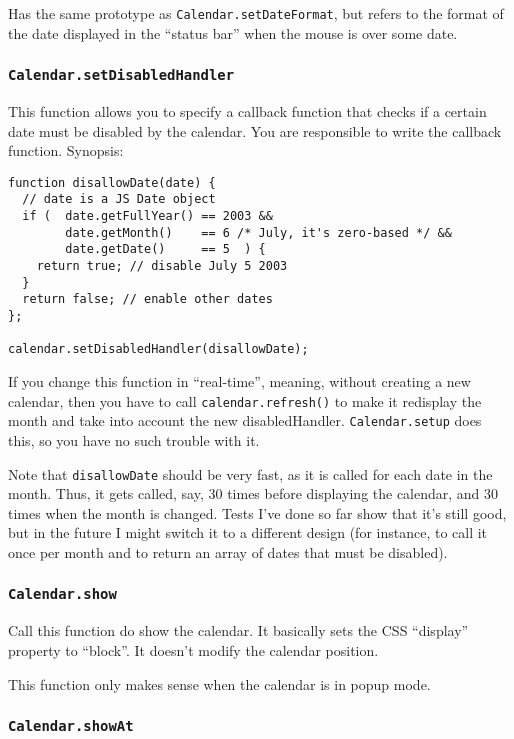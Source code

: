 \documentclass[a4paper,10pt]{article}
\begin{document}
Has the same prototype as \texttt{Calendar.setDateFormat}, but refers to the
format of the date displayed in the ``status bar'' when the mouse is over some
date.

\subsubsection{\texttt{Calendar.setDisabledHandler}}\label{sec:Calendar.setDisabledHandler}

This function allows you to specify a callback function that checks if a
certain date must be disabled by the calendar.  You are responsible to write
the callback function.  Synopsis:

\begin{verbatim}
function disallowDate(date) {
  // date is a JS Date object
  if (  date.getFullYear() == 2003 &&
        date.getMonth()    == 6 /* July, it's zero-based */ &&
        date.getDate()     == 5  ) {
    return true; // disable July 5 2003
  }
  return false; // enable other dates
};

calendar.setDisabledHandler(disallowDate);
\end{verbatim}

If you change this function in ``real-time'', meaning, without creating a new
calendar, then you have to call \texttt{calendar.refresh()} to make it
redisplay the month and take into account the new disabledHandler.
\texttt{Calendar.setup} does this, so you have no such trouble with it.

Note that \texttt{disallowDate} should be very fast, as it is called for each
date in the month.  Thus, it gets called, say, 30 times before displaying the
calendar, and 30 times when the month is changed.  Tests I've done so far show
that it's still good, but in the future I might switch it to a different design
(for instance, to call it once per month and to return an array of dates that
must be disabled).

\subsubsection{\texttt{Calendar.show}}\label{sec:Calendar.show}

Call this function do show the calendar.  It basically sets the CSS ``display''
property to ``block''.  It doesn't modify the calendar position.

This function only makes sense when the calendar is in popup mode.

\subsubsection{\texttt{Calendar.showAt}}\label{sec:Calendar.showAt}
\end{document}
